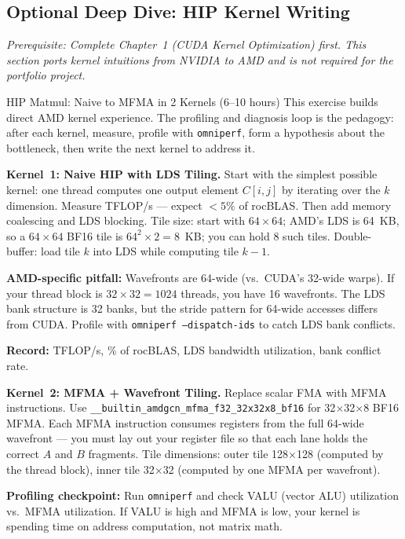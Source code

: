 \subsection{Optional Deep Dive: HIP Kernel Writing}

\textit{Prerequisite: Complete Chapter~1 (CUDA Kernel Optimization) first. This section ports kernel intuitions from NVIDIA to AMD and is not required for the portfolio project.}

\begin{exercise}{HIP Matmul: Naive to MFMA in 2 Kernels (6--10 hours)}
This exercise builds direct AMD kernel experience. The profiling and diagnosis loop is the pedagogy: after each kernel, measure, profile with \texttt{omniperf}, form a hypothesis about the bottleneck, then write the next kernel to address it.

\textbf{Kernel~1: Naive HIP with LDS Tiling.}
Start with the simplest possible kernel: one thread computes one output element $C[i,j]$ by iterating over the $k$ dimension. Measure TFLOP/s --- expect $<5\%$ of rocBLAS. Then add memory coalescing and LDS blocking. Tile size: start with $64 \times 64$; AMD's LDS is 64~KB, so a $64 \times 64$ BF16 tile is $64^2 \times 2 = 8$~KB; you can hold 8 such tiles. Double-buffer: load tile $k$ into LDS while computing tile $k-1$.

\textbf{AMD-specific pitfall:} Wavefronts are 64-wide (vs.\ CUDA's 32-wide warps). If your thread block is $32 \times 32 = 1024$ threads, you have 16 wavefronts. The LDS bank structure is 32 banks, but the stride pattern for 64-wide accesses differs from CUDA. Profile with \texttt{omniperf --dispatch-ids} to catch LDS bank conflicts.

\textbf{Record:} TFLOP/s, \% of rocBLAS, LDS bandwidth utilization, bank conflict rate.

\medskip
\textbf{Kernel~2: MFMA + Wavefront Tiling.}
Replace scalar FMA with MFMA instructions. Use \texttt{\_\_builtin\_amdgcn\_mfma\_f32\_32x32x8\_bf16} for 32$\times$32$\times$8 BF16 MFMA. Each MFMA instruction consumes registers from the full 64-wide wavefront --- you must lay out your register file so that each lane holds the correct $A$ and $B$ fragments. Tile dimensions: outer tile 128$\times$128 (computed by the thread block), inner tile 32$\times$32 (computed by one MFMA per wavefront).

\textbf{Profiling checkpoint:} Run \texttt{omniperf} and check VALU (vector ALU) utilization vs.\ MFMA utilization. If VALU is high and MFMA is low, your kernel is spending time on address computation, not matrix math.


\end{exercise}

